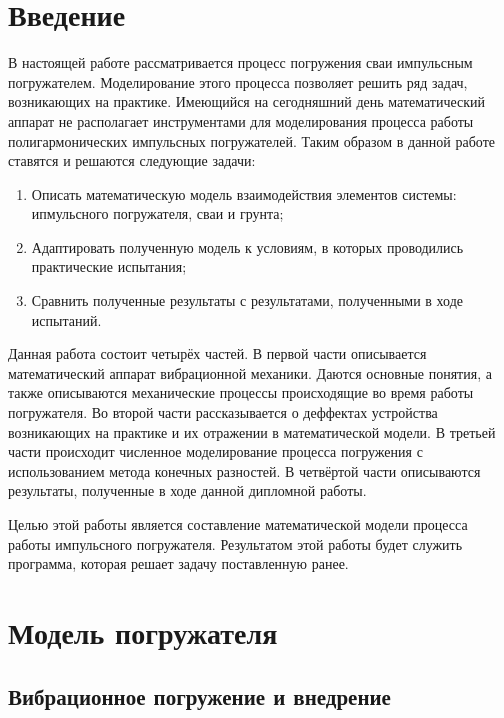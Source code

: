 \section*{Введение}

В настоящей работе рассматривается процесс погружения сваи импульсным погружателем. Моделирование этого процесса позволяет
решить ряд задач, возникающих на практике. Имеющийся на сегодняшний день математический аппарат не располагает инструментами
для моделирования процесса работы полигармонических импульсных погружателей. Таким образом в данной работе ставятся и решаются
следующие задачи:

\begin{enumerate}
    \item Описать математическую модель взаимодействия элементов системы: ипмульсного погружателя, сваи и грунта;
    \item Адаптировать полученную модель к условиям, в которых проводились практические испытания;
    \item Сравнить полученные результаты с результатами, полученными в ходе испытаний.
\end{enumerate}

Данная работа состоит четырёх частей. В первой части описывается математический аппарат вибрационной механики.
Даются основные понятия, а также описываются механические процессы происходящие во время работы погружателя.
Во второй части рассказывается о деффектах устройства возникающих на практике и их отражении в математической
модели. В третьей части происходит численное моделирование процесса погружения с использованием метода конечных
разностей. В четвёртой части описываются результаты, полученные в ходе данной дипломной работы.

Целью этой работы является составление математической модели процесса работы импульсного погружателя. Результатом этой
работы будет служить программа, которая решает задачу поставленную ранее.

\clearpage

\section{Модель погружателя}

\subsection{Вибрационное погружение и внедрение}

